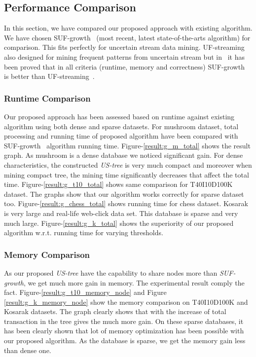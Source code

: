 \documentclass[conference]{IEEEtran}
\begin{document}
\subsection{Performance Comparison}
In this section, we have compared our proposed approach with existing algorithm. We have chosen SUF-growth~\cite{DBLP:conf/icde/LeungH09} (most recent, latest state-of-the-arts algorithm) for comparison. This fits perfectly for uncertain stream data mining. UF-streaming also designed for mining frequent patterns from uncertain stream but in~\cite{DBLP:conf/icde/LeungH09} it has been proved that in all criteria (runtime, memory and correctness) SUF-growth~\cite{DBLP:conf/icde/LeungH09} is better than UF-streaming~\cite{DBLP:conf/icde/LeungH09}.
            
\subsubsection{Runtime Comparison}
Our proposed approach has been assessed based on runtime against existing algorithm using both dense and sparse datasets. For mushroom dataset, total processing and running time of proposed algorithm have been compared with SUF-growth~\cite{DBLP:conf/icde/LeungH09} algorithm running time. Figure-\ref{result:g_m_total} shows the result graph. As mushroom is a dense database we noticed significant gain. For dense characteristics, the constructed \emph{US-tree} is very much compact and moreover when mining compact tree, the mining time significantly decreases that affect the total time. Figure-\ref{result:g_t10_total} shows same comparison for T40I10D100K dataset. The graphs show that our algorithm works correctly for sparse dataset too. Figure-\ref{result:g_chess_total} shows running time for chess dataset. Kosarak is very large and real-life web-click data set. This database is sparse and very much large. Figure-\ref{result:g_k_total} shows the superiority of our proposed algorithm w.r.t. running time for varying thresholds.
       
\subsubsection{Memory Comparison}
As our proposed \emph{US-tree} have the capability to share nodes more than \emph{SUF-growth}, we get much more gain in memory. The experimental result comply the fact. Figure-\ref{result:g_t10_memory_node} and Figure \ref{result:g_k_memory_node} show the memory comparison on T40I10D100K and Kosarak datasets. The graph clearly shows that with the increase of total transaction in the tree gives the much more gain. On these sparse databases, it has been clearly shown that lot of memory optimization has been possible with our proposed algorithm. As the database is sparse, we get the memory gain less than dense one.
\end{document}
